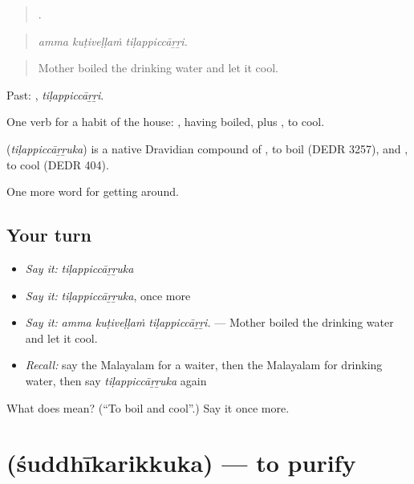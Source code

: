 \begin{quote}
  .
\end{quote}

\begin{quote}
\emph{amma kuṭiveḷḷaṁ tiḷappiccāṟṟi.}
\end{quote}

\begin{quote}
Mother boiled the drinking water and let it cool.
\end{quote}

Past: , \emph{tiḷappiccāṟṟi}.

One verb for a habit of the house: , having boiled, plus , to cool.

\begin{cousinweb}
\textbf{} (\emph{tiḷappiccāṟṟuka}) is a native Dravidian compound of , to boil (DEDR 3257), and , to cool (DEDR 404).
\end{cousinweb}

\begin{grammarlens}[title={What you've built}]
One more word for getting around.
\end{grammarlens}

\subsection*{Your turn}
\begin{itemize}
\raggedright
  \item \emph{Say it:} \emph{tiḷappiccāṟṟuka}
  \item \emph{Say it:} \emph{tiḷappiccāṟṟuka}, once more
  \item \emph{Say it:} \emph{amma kuṭiveḷḷaṁ tiḷappiccāṟṟi.} — Mother boiled the drinking water and let it cool.
  \item \emph{Recall:} say the Malayalam for a waiter, then the Malayalam for drinking water, then say \emph{tiḷappiccāṟṟuka} again
\end{itemize}

\begin{tcolorbox}[breakable,colback=teal!4,colframe=teal!35!black,title={Before you move on}]
What does  mean? (\textquotedblleft{}To boil and cool\textquotedblright{}.) Say it once more.
\end{tcolorbox}
\section[\texorpdfstring{\ml{ശുദ്ധീകരിക്കുക} (śuddhīkarikkuka)}{ശുദ്ധീകരിക്കുക (śuddhīkarikkuka)}]{ (śuddhīkarikkuka) — to purify}

